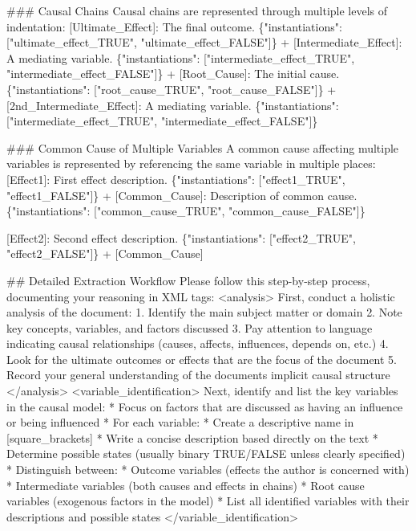 \documentclass[
  11pt,
  letterpaper,
]{book}
\newenvironment{Shaded}{\begin{snugshade}}{\end{snugshade}}
\newcommand{\StringTok}[1]{\textcolor[rgb]{0.13,0.47,0.30}{#1}}
\begin{document}
\begin{Shaded}
\begin{Highlighting}[]
\StringTok{\#\#\# Causal Chains}
\StringTok{Causal chains are represented through multiple levels of indentation:}
\StringTok{[Ultimate\_Effect]: The final outcome. \{"instantiations": ["ultimate\_effect\_TRUE", "ultimate\_effect\_FALSE"]\}}
\StringTok{  + [Intermediate\_Effect]: A mediating variable. \{"instantiations": ["intermediate\_effect\_TRUE", "intermediate\_effect\_FALSE"]\}}
\StringTok{    + [Root\_Cause]: The initial cause. \{"instantiations": ["root\_cause\_TRUE", "root\_cause\_FALSE"]\}}
\StringTok{  + [2nd\_Intermediate\_Effect]: A mediating variable. \{"instantiations": ["intermediate\_effect\_TRUE", "intermediate\_effect\_FALSE"]\}}


\StringTok{\#\#\# Common Cause of Multiple Variables}
\StringTok{A common cause affecting multiple variables is represented by referencing the same variable in multiple places:}
\StringTok{[Effect1]: First effect description. \{"instantiations": ["effect1\_TRUE", "effect1\_FALSE"]\}}
\StringTok{  + [Common\_Cause]: Description of common cause. \{"instantiations": ["common\_cause\_TRUE", "common\_cause\_FALSE"]\}}

\StringTok{[Effect2]: Second effect description. \{"instantiations": ["effect2\_TRUE", "effect2\_FALSE"]\}}
\StringTok{  + [Common\_Cause]}

\StringTok{\#\# Detailed Extraction Workflow}
\StringTok{Please follow this step{-}by{-}step process, documenting your reasoning in XML tags:}
\StringTok{\textless{}analysis\textgreater{}}
\StringTok{First, conduct a holistic analysis of the document:}
\StringTok{1. Identify the main subject matter or domain}
\StringTok{2. Note key concepts, variables, and factors discussed}
\StringTok{3. Pay attention to language indicating causal relationships (causes, affects, influences, depends on, etc.)}
\StringTok{4. Look for the ultimate outcomes or effects that are the focus of the document}
\StringTok{5. Record your general understanding of the document\textquotesingle{}s implicit causal structure}
\StringTok{\textless{}/analysis\textgreater{}}
\StringTok{\textless{}variable\_identification\textgreater{}}
\StringTok{Next, identify and list the key variables in the causal model:}
\StringTok{* Focus on factors that are discussed as having an influence or being influenced}
\StringTok{* For each variable:}
\StringTok{  * Create a descriptive name in [square\_brackets]}
\StringTok{  * Write a concise description based directly on the text}
\StringTok{  * Determine possible states (usually binary TRUE/FALSE unless clearly specified)}
\StringTok{* Distinguish between:}
\StringTok{  * Outcome variables (effects the author is concerned with)}
\StringTok{  * Intermediate variables (both causes and effects in chains)}
\StringTok{  * Root cause variables (exogenous factors in the model)}
\StringTok{* List all identified variables with their descriptions and possible states}
\StringTok{\textless{}/variable\_identification\textgreater{}}


\end{Highlighting}
\end{Shaded}
\end{document}
